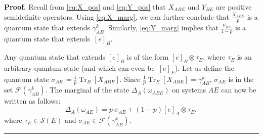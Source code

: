 \documentclass[twocolumn,letterpaper, dvipsnames,allowtoday, accepted = 2025-12-31]{quantumarticle}
\newenvironment{proof}[1][Proof]{\noindent\textbf{#1.} }{\ \rule{0.5em}{0.5em}}
\begin{document}
\begin{proof}
    Recall from \eqref{eq:X_pos} and \eqref{eq:Y_pos} that $X_{ABE}$ and $Y_{BE}$ are positive semidefinite operators. Using \eqref{eq:X_marg}, we can further conclude that $\frac{X_{ABE}}{p}$ is a quantum state that extends $\gamma^k_{AB}$. Similarly, \eqref{eq:Y_marg} implies that $\frac{Y_{BE}}{1-p}$ is a quantum state that extends~$[e]_B$. 
    
    Any quantum state that extends $[e]_B$ is of the form $[e]_B\otimes\tau_E$, where $\tau_E$ is an arbitrary quantum state (and which can even be~$[e]_E$). Let us define the quantum state $\sigma_{AE} \coloneqq \frac{1}{p}\operatorname{Tr}_B\!\left[X_{ABE}\right]$. Since $\frac{1}{p}\operatorname{Tr}_E\!\left[X_{ABE}\right] = \gamma^k_{AB}$, $\sigma_{AE}$ is in the set $\mathcal{F}\!\left(\gamma^k_{AB}\right)$. The marginal of the state $\Delta_A\!\left(\omega_{ABE}\right)$ on systems $AE$ can now be written as follows:
    \begin{equation}
        \Delta_A\!\left(\omega_{AE}\right) = p~\sigma_{AE} + (1-p)[e]_A\otimes\tau_E,
    \end{equation}
    where $\tau_E \in \mathcal{S}\!\left(E\right)$ and $\sigma_{AE} \in \mathcal{F}\!\left(\gamma^k_{AB}\right)$.
\end{proof}

\medskip
\end{document}

